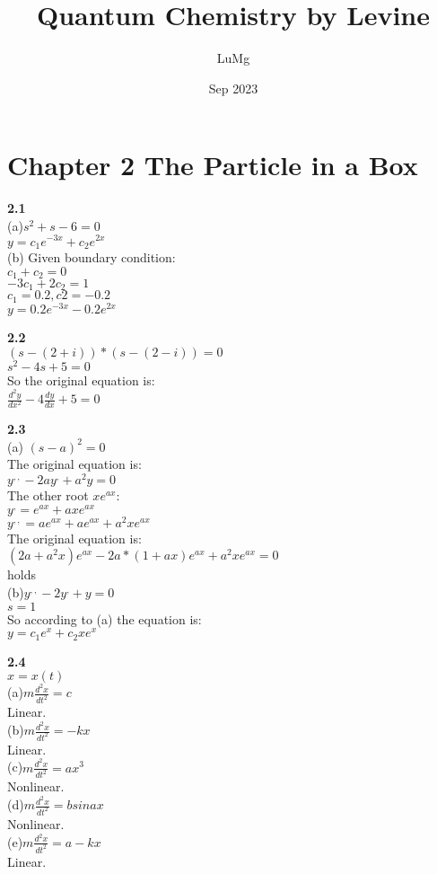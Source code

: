 \documentclass{article}
\title{Quantum Chemistry by Levine}
\author{LuMg}
\date{Sep 2023}
\begin{document}
\maketitle

\section{Chapter 2 The Particle in a Box}
\textbf{2.1}\\
(a)$s^2+s-6 = 0$\\
$y = c_1e^{-3x}+c_2e^{2x}$\\
(b) Given boundary condition:\\
$c_1+c_2=0$\\
$-3c_1+2c_2 = 1$\\
$c_1 = 0.2, c2=-0.2$\\
$y = 0.2e^{-3x}-0.2e^{2x}$\\
\newline

\textbf{2.2}\\
$(s-(2+i))*(s - (2-i)) = 0$\\
$s^2 - 4s + 5 = 0$\\
So the original equation is:\\
$\frac{d^2y}{dx^2}-4\frac{dy}{dx}+5 = 0$\\
\newline

\textbf{2.3}\\
(a) $(s-a)^2=0$\\
The original equation is:\\
$y^{,,} - 2ay^{,} + a^2y = 0$\\
The other root $xe^{ax}$:\\
$y^{,} = e^{ax}+axe^{ax}$\\
$y^{,,} = ae^{ax}+ae^{ax}+a^2xe^{ax}$\\
The original equation is:\\
$(2a+a^2x)e^{ax} - 2a*(1+ax)e^{ax}+ a^2xe^{ax} = 0$\\
holds\\
(b)$y^{,,} - 2y^{,}+y = 0$\\
$s = 1$\\
So according to (a) the equation is:\\
$y = c_1e^x+c_2xe^x$\\
\newline

\textbf{2.4}\\
$x = x(t)$\\
(a)$m\frac{d^2x}{dt^2} = c$\\
Linear.\\
(b)$m\frac{d^2x}{dt^2} = -kx$\\
Linear.\\
(c)$m\frac{d^2x}{dt^2} = ax^3$\\
Nonlinear.\\
(d)$m\frac{d^2x}{dt^2} = bsinax$\\
Nonlinear.\\
(e)$m\frac{d^2x}{dt^2} = a-kx$\\
Linear.\\
\newline
\end{document}
